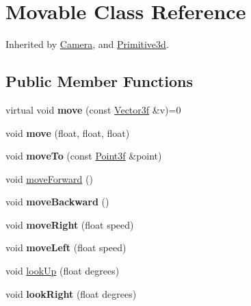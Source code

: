 \hypertarget{class_movable}{\section{Movable Class Reference}
\label{class_movable}
}


Inherited by \hyperlink{class_camera}{Camera}, and \hyperlink{class_primitive3d}{Primitive3d}.

\subsection*{Public Member Functions}
\begin{DoxyCompactItemize}
\item 
\hypertarget{class_movable_a7e6b5f12e0434f6eddb015f7cf0b4984}{virtual void {\bfseries move} (const \hyperlink{struct_vector3f}{Vector3f} \&v)=0}\label{class_movable_a7e6b5f12e0434f6eddb015f7cf0b4984}

\item 
\hypertarget{class_movable_a5de86eed18b504299551ab318b8d602a}{void {\bfseries move} (float, float, float)}\label{class_movable_a5de86eed18b504299551ab318b8d602a}

\item 
\hypertarget{class_movable_a2cd85c3f9b53c505432fcb03d0738289}{void {\bfseries move\-To} (const \hyperlink{struct_point3f}{Point3f} \&point)}\label{class_movable_a2cd85c3f9b53c505432fcb03d0738289}

\item 
void \hyperlink{class_movable_a180504b38f6ac2bc8569a3836ceb2518}{move\-Forward} ()
\item 
\hypertarget{class_movable_a5cb4fff63d0f9976a6a36d45264558d2}{void {\bfseries move\-Backward} ()}\label{class_movable_a5cb4fff63d0f9976a6a36d45264558d2}

\item 
\hypertarget{class_movable_a4ba840c0682c8e1a9199f9ebbb8b7d31}{void {\bfseries move\-Right} (float speed)}\label{class_movable_a4ba840c0682c8e1a9199f9ebbb8b7d31}

\item 
\hypertarget{class_movable_a25b3edfbc5d1e4f9fce57cd6180fb04d}{void {\bfseries move\-Left} (float speed)}\label{class_movable_a25b3edfbc5d1e4f9fce57cd6180fb04d}

\item 
void \hyperlink{class_movable_af0fab32ae172e52ab9cded5e43fde054}{look\-Up} (float degrees)
\item 
\hypertarget{class_movable_a2c004d01486a124c1cd4c24de71ec9fc}{void {\bfseries look\-Right} (float degrees)}\label{class_movable_a2c004d01486a124c1cd4c24de71ec9fc}


\end{DoxyCompactItemize}
